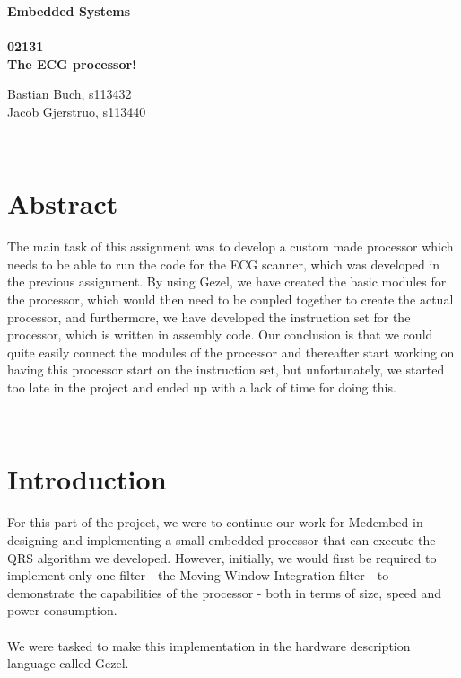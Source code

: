 \documentclass[12pt,a4paper]{article}
\begin{document}
\begin{titlepage}
	\begin{center}
		\vspace*{13\baselineskip}
		\huge
		\bfseries
		Embedded Systems\\ 
		\ \\
		02131 \\[5\baselineskip]

		\normalfont
		\Large
		The ECG processor!\\	

		\small
		\vfill
	\end{center}	
	\begin{flushleft}
		Bastian Buch, s113432\\
	 	Jacob Gjerstruo, s113440\\
	\end{flushleft}
\end{titlepage}

\ \\
\section*{Abstract}
	The main task of this assignment was to develop a custom made processor which needs to be able to run the code for the ECG scanner, which was developed in the previous assignment. By using Gezel, we have created the basic modules for the processor, which would then need to be coupled together to create the actual processor, and furthermore, we have developed the instruction set for the processor, which is written in assembly code. Our conclusion is that we could quite easily connect the modules of the processor and thereafter start working on having this processor start on the instruction set, but unfortunately, we started too late in the project and ended up with a lack of time for doing this.
\thispagestyle{empty} 
\newpage

\tableofcontents
\thispagestyle{empty} 
\newpage

\setcounter{page}{1}

\ \\
\section{Introduction}
For this part of the project, we were to continue our work for Medembed in designing and implementing a small embedded processor that can execute the QRS algorithm we developed. However, initially, we would first be required to implement only one filter - the Moving Window Integration filter - to demonstrate the capabilities of the processor - both in terms of size, speed and power consumption.\\
\\
We were tasked to make this implementation in the hardware description language called Gezel.\\
\end{document}

